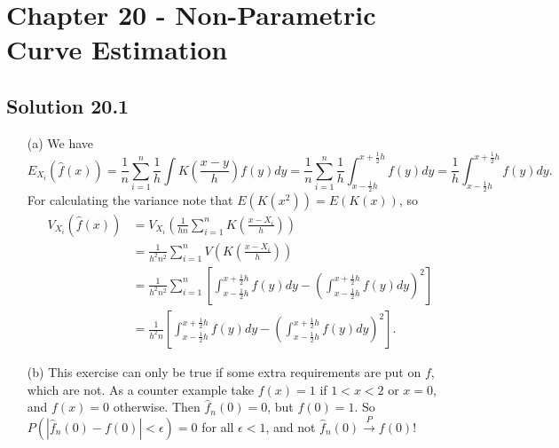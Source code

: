 \section*{Chapter 20 - Non-Parametric Curve Estimation}

\subsection*{Solution 20.1}

\begin{itemize}
    \item[(a)]
        We have
        \begin{equation*}
            E_{X_i}(\hat{f}(x))
                = \frac{1}{n} \sum_{i = 1}^n \frac{1}{h} \int K\left(\frac{x - y}{h}\right) f(y) dy
                = \frac{1}{n} \sum_{i = 1}^n \frac{1}{h} \int_{x - \frac{1}{2}h}^{x + \frac{1}{2}h} f(y) dy
                = \frac{1}{h} \int_{x - \frac{1}{2}h}^{x + \frac{1}{2}h} f(y) dy.
        \end{equation*}
        For calculating the variance note that $E(K(x^2)) = E(K(x))$, so
        \begin{equation*}
            \begin{split}
                V_{X_i}(\hat{f}(x))
                    &= V_{X_i}\left(\frac{1}{hn} \sum_{i = 1}^n K\left(\frac{x - X_i}{h}\right)\right) \\
                    &= \frac{1}{h^2 n^2} \sum_{i = 1}^n V\left(K\left(\frac{x - X_i}{h}\right)\right) \\
                    &= \frac{1}{h^2 n^2} \sum_{i = 1}^n \left[
                        \int_{x - \frac{1}{2}h}^{x + \frac{1}{2}h} f(y) dy
                        - \left(\int_{x - \frac{1}{2}h}^{x + \frac{1}{2}h} f(y) dy \right)^2
                    \right] \\
                    &= \frac{1}{h^2 n} \left[
                        \int_{x - \frac{1}{2}h}^{x + \frac{1}{2}h} f(y) dy
                        - \left(\int_{x - \frac{1}{2}h}^{x + \frac{1}{2}h} f(y) dy \right)^2
                    \right].
            \end{split}
        \end{equation*}
    \item[(b)] This exercise can only be true if some extra requirements are put on $f$, which are not.
        As a counter example take $f(x) = 1$ if $1 < x < 2$ or $x = 0$, and $f(x) = 0$ otherwise.
        Then $\hat{f}_n(0) = 0$, but $f(0) = 1$.
        So $P(|\hat{f}_n(0) - f(0)| < \epsilon) = 0$ for all $\epsilon < 1$, and not $\hat{f}_n(0) \xrightarrow{P} f(0)$!
\end{itemize}


